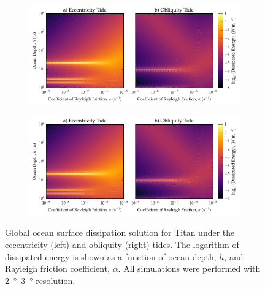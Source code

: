 \begin{figure}[!t]
    \centering
    \begin{subfigure}[t]{0.85\linewidth} %
        \includegraphics[width=\linewidth]{Figures/titan_linear}
        \label{fig:lincEccTitan}
    \end{subfigure}
    \begin{subfigure}[t]{0\linewidth} %
         \includegraphics[width=\linewidth]{Figures/titan_linear}
         \label{fig:linObliqTitan}   
    \end{subfigure}
    \vspace{-0.5cm}
\caption{Global ocean surface dissipation solution for Titan under the eccentricity (left) and obliquity (right) tides. The logarithm of dissipated energy is shown as a function of ocean depth, $h$, and Rayleigh friction coefficient, $\alpha$. All simulations were performed with \SIrange{2}{3}{\degree} resolution.}
\label{fig:linTitan}
\end{figure}

